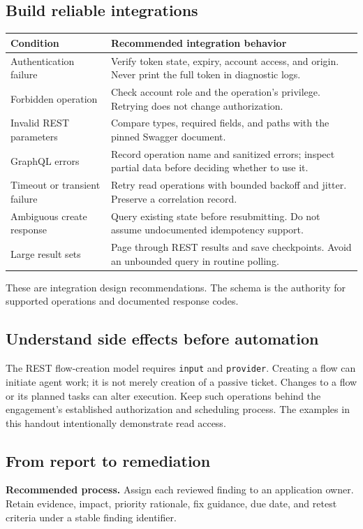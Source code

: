 \documentclass[11pt,letterpaper]{article}
\newcommand{\code}[1]{\nolinkurl{#1}}
\newcommand{\src}[1]{\cite{#1}}
\begin{document}
\subsection{Build reliable integrations}
\begin{tabularx}{\textwidth}{@{}L{0.28\textwidth}Y@{}}
\toprule
\textbf{Condition} & \textbf{Recommended integration behavior}\\
\midrule
Authentication failure & Verify token state, expiry, account access, and origin.
Never print the full token in diagnostic logs.\\
Forbidden operation & Check account role and the operation's privilege.
Retrying does not change authorization.\\
Invalid REST parameters & Compare types, required fields, and paths with the
pinned Swagger document.\\
GraphQL errors & Record operation name and sanitized errors; inspect partial
data before deciding whether to use it.\\
Timeout or transient failure & Retry read operations with bounded backoff and
jitter. Preserve a correlation record.\\
Ambiguous create response & Query existing state before resubmitting.
Do not assume undocumented idempotency support.\\
Large result sets & Page through REST results and save checkpoints.
Avoid an unbounded query in routine polling.\\
\bottomrule
\end{tabularx}
These are integration design recommendations. The schema is the authority for
supported operations and documented response codes. \src{swagger,graphql}

\subsection{Understand side effects before automation}
The REST flow-creation model requires \code{input} and \code{provider}.
Creating a flow can initiate agent work; it is not merely creation of a passive
ticket. Changes to a flow or its planned tasks can alter execution. Keep such
operations behind the engagement's established authorization and scheduling
process. The examples in this handout intentionally demonstrate read access.
\src{swagger,flow}

\subsection{From report to remediation}
\textbf{Recommended process.} Assign each reviewed finding to an application owner. Retain evidence, impact,
priority rationale, fix guidance, due date, and retest criteria under a stable
finding identifier.
\end{document}
